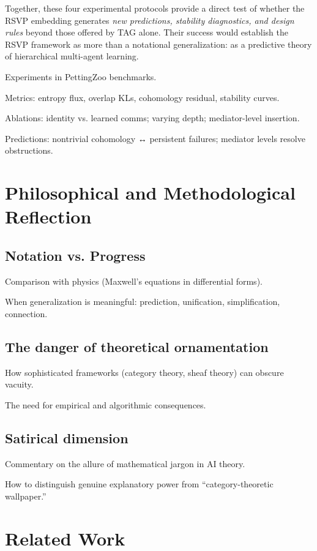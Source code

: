 \documentclass[11pt,a4paper]{article}
\begin{document}
\medskip
Together, these four experimental protocols provide a direct test of whether the
RSVP embedding generates \emph{new predictions, stability diagnostics, and
design rules} beyond those offered by TAG alone. Their success would establish
the RSVP framework as more than a notational generalization: as a predictive
 theory of hierarchical multi-agent learning.

Experiments in PettingZoo benchmarks.

Metrics: entropy flux, overlap KLs, cohomology residual, stability curves.

Ablations: identity vs. learned comms; varying depth; mediator-level insertion.

Predictions: nontrivial cohomology ↔ persistent failures; mediator levels resolve obstructions.

\section{Philosophical and Methodological Reflection}

\subsection{Notation vs. Progress}

Comparison with physics (Maxwell’s equations in differential forms).

When generalization is meaningful: prediction, unification, simplification, connection.

\subsection{The danger of theoretical ornamentation}

How sophisticated frameworks (category theory, sheaf theory) can obscure vacuity.

The need for empirical and algorithmic consequences.

\subsection{Satirical dimension}

Commentary on the allure of mathematical jargon in AI theory.

How to distinguish genuine explanatory power from “category-theoretic wallpaper.”

\section{Related Work}
\end{document}
